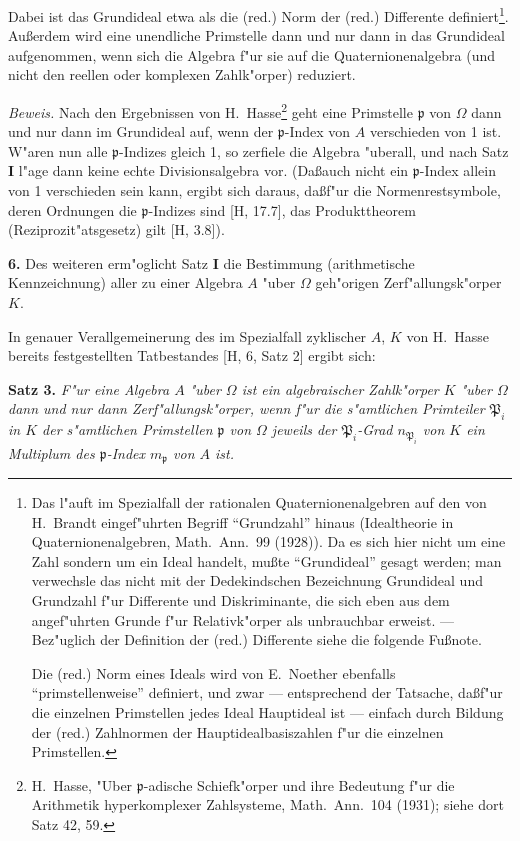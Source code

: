 \documentclass[12pt,a4paper]{article}
\theoremstyle{plain}
\begin{document}
Dabei ist das Grundideal etwa als die (red.) Norm der (red.) Differente definiert\footnote{Das l"auft im Spezialfall der rationalen Quaternionenalgebren auf den von H.\ Brandt eingef"uhrten Begriff ``Grundzahl'' hinaus (Idealtheorie in Quaternionenalgebren, Math.\ Ann.\ 99 (1928)). Da es sich hier nicht um eine Zahl sondern um ein Ideal handelt, mu\ss te ``Grundideal'' gesagt werden; man verwechsle das nicht mit der Dedekindschen Bezeichnung Grundideal und Grundzahl f"ur Differente und Diskriminante, die sich eben aus dem angef"uhrten Grunde f"ur Relativk"orper als unbrauchbar erweist. --- Bez"uglich der Definition der (red.) Differente siehe die folgende Fu\ss note.

Die (red.) Norm eines Ideals wird von E.\ Noether ebenfalls ``primstellenweise'' definiert, und zwar --- entsprechend der Tatsache, da\ss f"ur die einzelnen Primstellen jedes Ideal Hauptideal ist --- einfach durch Bildung der (red.) Zahlnormen der Hauptidealbasiszahlen f"ur die einzelnen Primstellen.}. Au\ss erdem wird eine unendliche Primstelle dann und nur dann in das Grundideal aufgenommen, wenn sich die Algebra f"ur sie auf die Quaternionenalgebra (und nicht den reellen oder komplexen Zahlk"orper) reduziert.

\noindent\textit{Beweis.}
Nach den Ergebnissen von H.\ Hasse\footnote{H.\ Hasse, "Uber $\mathfrak{p}$-adische Schiefk"orper und ihre Bedeutung f"ur die Arithmetik hyperkomplexer Zahlsysteme, Math.\ Ann.\ 104 (1931); siehe dort Satz 42, 59.} geht eine Primstelle $\mathfrak{p}$ von $\Omega$ dann und nur dann im Grundideal auf, wenn der $\mathfrak{p}$-Index von $A$ verschieden von 1 ist. W"aren nun alle $\mathfrak{p}$-Indizes gleich 1, so zerfiele die Algebra "uberall, und nach Satz \textbf{I} l"age dann keine echte Divisionsalgebra vor. (Da\ss auch nicht ein $\mathfrak{p}$-Index allein von 1 verschieden sein kann, ergibt sich daraus, da\ss f"ur die Normenrestsymbole, deren Ordnungen die $\mathfrak{p}$-Indizes sind [H, 17.7], das Produkttheorem (Reziprozit"atsgesetz) gilt [H, 3.8]).

\medskip\noindent\textbf{6.}
Des weiteren erm"oglicht Satz \textbf{I} die Bestimmung (arithmetische Kennzeichnung) aller zu einer Algebra $A$ "uber $\Omega$ geh"origen Zerf"allungsk"orper $K$.

In genauer Verallgemeinerung des im Spezialfall zyklischer $A$, $K$ von H.\ Hasse bereits festgestellten Tatbestandes [H, 6, Satz 2] ergibt sich:

\medskip\noindent\textbf{Satz 3.}
\textit{F"ur eine Algebra $A$ "uber $\Omega$ ist ein algebraischer Zahlk"orper $K$ "uber $\Omega$ dann und nur dann Zerf"allungsk"orper, wenn f"ur die s"amtlichen Primteiler $\mathfrak{P}_i$ in $K$ der s"amtlichen Primstellen $\mathfrak{p}$ von $\Omega$ jeweils der $\mathfrak{P}_i$-Grad $n_{\mathfrak{P}_i}$ von $K$ ein Multiplum des $\mathfrak{p}$-Index $m_\mathfrak{p}$ von $A$ ist.}
\end{document}
